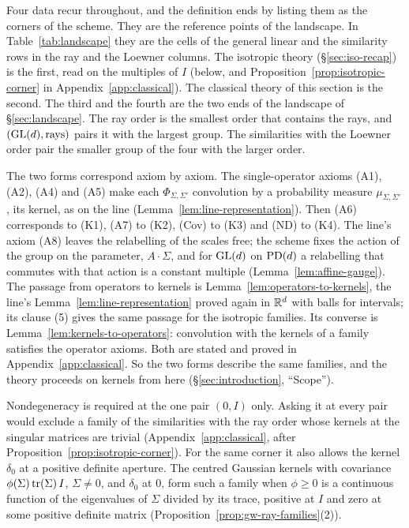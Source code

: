 Four data recur throughout, and the definition ends by listing them as the corners of
the scheme. They are the reference points of the landscape. In Table~\ref{tab:landscape} they are
the cells of the general linear and the similarity rows in the ray and the Loewner columns. The
isotropic theory (\S\ref{sec:iso-recap}) is the first, read on the multiples of $I$
(below, and Proposition~\ref{prop:isotropic-corner} in Appendix~\ref{app:classical}). The classical
theory of this section is the second. The third and the fourth are the two ends of the landscape of \S\ref{sec:landscape}. The
ray order is the smallest order that contains the rays, and $(\mathrm{GL}(d), \text{rays})$ pairs it with
the largest group. The similarities with the Loewner order pair the smaller group of the four with
the larger order.

The two forms correspond axiom by axiom. The single-operator axioms (A1), (A2), (A4) and (A5) make
each $\Phi_{\Sigma,\Sigma'}$ convolution by a probability measure $\mu_{\Sigma,\Sigma'}$, its kernel,
as on the line (Lemma~\ref{lem:line-representation}). Then (A6) corresponds to (K1), (A7) to (K2), (Cov) to (K3) and (ND) to (K4). The line's axiom (A8) leaves the
relabelling of the scales free; the scheme fixes the action of the group on the parameter,
$A \cdot \Sigma$, and for $\mathrm{GL}(d)$ on $\mathrm{PD}(d)$ a relabelling that commutes with that action is a
constant multiple (Lemma~\ref{lem:affine-gauge}). The passage from operators to kernels is
Lemma~\ref{lem:operators-to-kernels}, the line's Lemma~\ref{lem:line-representation} proved again in
$\mathbb{R}^d$ with balls for intervals; its clause (5) gives the same passage for the isotropic families.
Its converse is Lemma~\ref{lem:kernels-to-operators}: convolution with the kernels of a family
satisfies the operator axioms. Both are stated and proved in Appendix~\ref{app:classical}. So the
two forms describe the same families, and the theory proceeds on kernels from here
(\S\ref{sec:introduction}, ``Scope'').

Nondegeneracy is required at the one pair $(0, I)$ only.
Asking it at every pair would exclude a family of the similarities with the ray order whose
kernels at the singular matrices are trivial (Appendix~\ref{app:classical}, after
Proposition~\ref{prop:isotropic-corner}).
For the same corner it also allows the kernel $\delta_0$ at a positive definite aperture. The centred
Gaussian kernels with covariance $\phi(\Sigma)\operatorname{tr}(\Sigma)\,I$, $\Sigma \ne 0$, and $\delta_0$ at $0$, form such
a family when $\phi \ge 0$ is a continuous function of the eigenvalues of $\Sigma$ divided by its
trace, positive at $I$ and zero at some positive definite matrix
(Proposition~\ref{prop:gw-ray-families}(2)).

